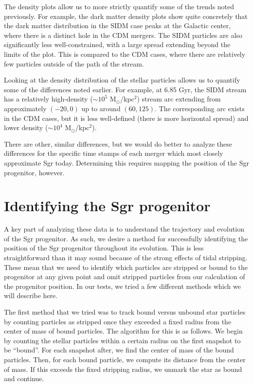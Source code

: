 The density plots allow us to more strictly quantify some of the trends noted
previously. For example, the dark matter density plots show quite concretely
that the dark matter distribution in the SIDM case peaks at the Galactic center,
where there is a distinct hole in the CDM mergers. The SIDM particles are also
significantly less well-constrained, with a large spread extending beyond the
limits of the plot. This is compared to the CDM cases, where there are
relatively few particles outside of the path of the stream.

Looking at the density distribution of the stellar particles allows us to
quantify some of the differences noted earlier.  For example, at 6.85 Gyr, the
SIDM stream has a relatively high-density ($\sim 10^5$ M$_\odot$/kpc$^2$)
stream arc extending from approximately $(-20,0)$ up to around $(60,125)$.
The corresponding arc exists in the CDM cases, but it is less well-defined
(there is more horizontal spread) and lower density ($\sim 10^4$
M$_\odot$/kpc$^2$).

There are other, similar differences, but we would do better to analyze these
differences for the specific time stamps of each merger which most closely
approximate Sgr today. Determining this requires mapping the position of the Sgr
progenitor, however.

\hypertarget{identifying-the-sgr-progenitor}{%
\section{Identifying the Sgr
progenitor}\label{identifying-the-sgr-progenitor}}

A key part of analyzing these data is to understand the trajectory and
evolution of the Sgr progenitor.  As such, we desire a method for successfully
identifying the position of the Sgr progenitor throughout its evolution.  This
is less straightforward than it may sound because of the strong effects of
tidal stripping.  These mean that we need to identify which particles are
stripped or bound to the progenitor at any given point and omit stripped
particles from our calculation of the progenitor position.  In our tests, we
tried a few different methods which we will describe here.

The first method that we tried was to track bound versus unbound star
particles by counting particles as stripped once they exceeded a fixed radius
from the center of mass of bound particles.  The algorithm for this is as
follows.  We begin by counting the stellar particles within a certain radius
on the first snapshot to be ``bound''.  For each snapshot after, we find the
center of mass of the bound particles.  Then, for each bound particle, we
compute its distance from the center of mass.  If this exceeds the fixed
stripping radius, we unmark the star as bound and continue.

